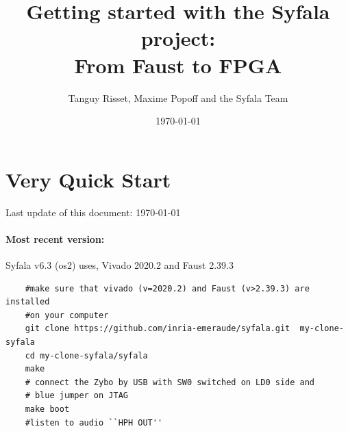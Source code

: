 \documentclass[11pt]{article}
\title{\Large\bf Getting started with the Syfala project: \\ From Faust to FPGA}
\author{Tanguy Risset, Maxime Popoff and the Syfala Team}
\date{\today}
\numberwithin{equation}{section}
\numberwithin{figure}{section}
\begin{document}
\maketitle

\tableofcontents

\setcounter{section}{-1}
\newpage
\section{Very Quick Start}
Last update of this document: \today

\paragraph{Most recent version:} Syfala v6.3 (os2) uses, Vivado 2020.2 and Faust 2.39.3\\

\begin{boxedminipage}{1.03\textwidth}
  \begin{verbatim}
    #make sure that vivado (v=2020.2) and Faust (v>2.39.3) are installed
    #on your computer
    git clone https://github.com/inria-emeraude/syfala.git  my-clone-syfala
    cd my-clone-syfala/syfala
    make
    # connect the Zybo by USB with SW0 switched on LD0 side and
    # blue jumper on JTAG
    make boot
    #listen to audio ``HPH OUT''
\end{verbatim}
\end{boxedminipage}

~\\
\end{document}

